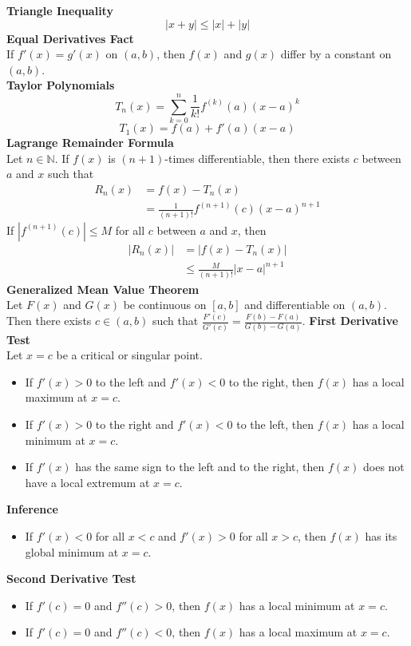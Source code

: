 \documentclass[10pt]{article}
\newcommand{\N}{{\mathbb N}}
\begin{document}
\begin{multicols}{3}
\textbf{Triangle Inequality} \\
\[|x+y|\le |x|+|y|\]
\textbf{Equal Derivatives Fact} \\
If $f'(x)=g'(x)$ on $(a,b)$, then $f(x)$ and $g(x)$ differ by a constant on $(a,b)$. \\
\textbf{Taylor Polynomials} 
\[T_n(x)=\sum_{k=0}^n \frac{1}{k!}f^{(k)}(a)(x-a)^k\]
\[T_1(x)=f(a)+f'(a)(x-a)\]
\textbf{Lagrange Remainder Formula} \\
Let $n\in \N$. If $f(x)$ is $(n+1)$-times differentiable, then there exists $c$ between $a$ and $x$ such that 
\begin{align*}
    R_n(x)&=f(x)-T_n(x)\\
    &=\frac{1}{(n+1)!}f^{(n+1)}(c)(x-a)^{n+1}
\end{align*}
If $|f^{(n+1)}(c)|\le M$ for all $c$ between $a$ and $x$, then 
\begin{align*}
    |R_n(x)|&=|f(x)-T_n(x)| \\
    &\le \frac{M}{(n+1)!}|x-a|^{n+1}
\end{align*}
\textbf{Generalized Mean Value Theorem} \\
Let $F(x)$ and $G(x)$ be continuous on $[a,b]$ and differentiable on $(a,b)$. Then there exists $c\in(a,b)$ such that $\frac{F'(c)}{G'(c)}=\frac{F(b)-F(a)}{G(b)-G(a)}$.
\textbf{First Derivative Test} \\
Let $x=c$ be a critical or singular point.
\begin{itemize}
    \item If $f'(x)>0$ to the left and $f'(x)<0$ to the right, then $f(x)$ has a local maximum at $x=c$.
    \item If $f'(x)>0$ to the right and $f'(x)<0$ to the left, then $f(x)$ has a local minimum at $x=c$.
    \item If $f'(x)$ has the same sign to the left and to the right, then $f(x)$ does not have a local extremum at $x=c$.
\end{itemize}
\textbf{Inference}
\begin{itemize}
    \item If $f'(x)<0$ for all $x<c$ and $f'(x)>0$ for all $x>c$, then $f(x)$ has its global minimum at $x=c$.
\end{itemize}
\textbf{Second Derivative Test} 
\begin{itemize}
    \item If $f'(c)=0$ and $f''(c)>0$, then $f(x)$ has a local minimum at $x=c$.
    \item If $f'(c)=0$ and $f''(c)<0$, then $f(x)$ has a local maximum at $x=c$.

\end{itemize}
\end{multicols}
\end{document}

